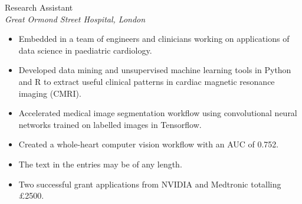 \documentclass[10pt]{article}
\begin{document}
{{\begin{minipage}[t]{0.5\textwidth}
{\raggedright\large Research Assistant\\
\textit{Great Ormond Street Hospital, London}\\[5pt]}

\begin{itemize}
  \item Embedded in a team of engineers and clinicians working on applications of data science in paediatric cardiology.
  \item Developed data mining and unsupervised machine learning tools in Python and R to extract useful clinical patterns in cardiac magnetic resonance imaging (CMRI).
  \item Accelerated medical image segmentation workflow using convolutional neural networks trained on labelled images in Tensorflow.
  \item Created a whole-heart computer vision workflow with an AUC of 0.752.
  \item The text in the entries may be of any length.
  \item Two successful grant applications from NVIDIA and Medtronic totalling £2500.
\end{itemize}

%
%

%
%


\end{minipage}}}
\end{document}
